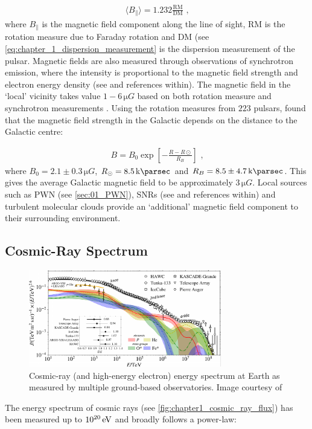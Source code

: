 \begin{equation}
    \begin{aligned}
    \langle B_\parallel \rangle = 1.232 \frac{\text{RM}}{\text{DM}}\text{ ,}
    \end{aligned}
\end{equation}
\noindent where $B_\parallel$ is the magnetic field component along the line of sight, RM is the rotation measure due to Faraday rotation and DM (see \autoref{eq:chapter_1_dispersion_measurement} is the dispersion measurement of the pulsar. Magnetic fields are also measured through observations of synchrotron emission, where the intensity is proportional to the magnetic field strength and electron energy density (see \cite{2013pss5.book..641B} and references within).
\newpar 
The magnetic field in the `local' vicinity takes value $1-6\,\si{\micro G}$ based on both rotation measure and synchrotron measurements  \citep{1989ApJ...343..760R,2001SSRv...99..243B}.  Using the rotation measures from $223$ pulsars, \cite{2006ApJ...642..868H} found that the magnetic field strength in the Galactic  depends on the distance to the Galactic centre:

\begin{equation}
    \begin{aligned}
        B=B_0\exp[-\frac{R-R\odot}{R_B }]\text{ ,}
    \end{aligned}
\end{equation}
where $B_0=2.1\pm 0.3\,\si{\micro G}$, $R_\odot=8.5\,\kpc$ and $R_B=8.5\pm 4.7\,\kpc$. This gives the average Galactic magnetic field to be approximately $ 3\,\si{\micro G}$. Local sources such as PWN (see \autoref{sec:01_PWN}), SNRs (see \citep{2012SSRv..166..231R} and references within) and turbulent molecular clouds \citep{2010ApJ...725..466C} provide an `additional' magnetic field component to their surrounding environment.

\subsection{Cosmic-Ray Spectrum} \label{sec:chapter_1_cr_spectrum}
\begin{figure}
    \centering
    \includegraphics[width=0.75\textwidth]{04_Introduction/Images/cosmic_rays/cosmic_ray_spectrum.pdf}
    \caption{Cosmic-ray (and high-energy electron) energy spectrum at Earth as measured by multiple ground-based observatories. Image courtesy of \cite{2019BAAS...51c.131S}}
    \label{fig:chapter1_cosmic_ray_flux}
\end{figure}
\newpar
The energy spectrum of cosmic rays (see \autoref{fig:chapter1_cosmic_ray_flux}) has been measured up to $10^{20}\,\si{\electronvolt}$ \citep{2022arXiv221116020T} and broadly follows a power-law:

